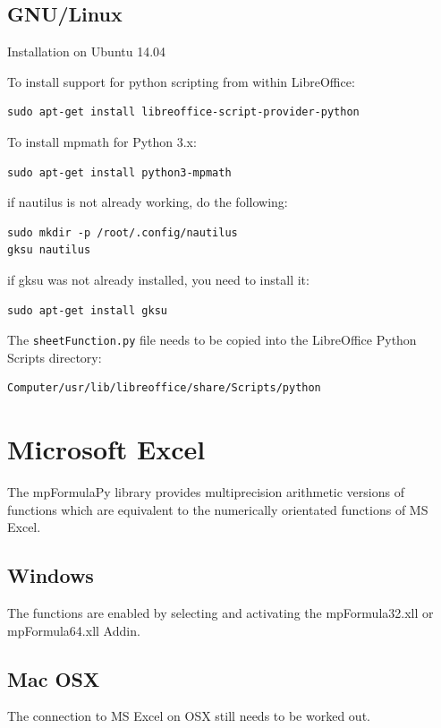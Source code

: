 \subsection{GNU/Linux}
Installation on Ubuntu 14.04

To install support for python scripting from within LibreOffice:
\begin{verbatim}
sudo apt-get install libreoffice-script-provider-python
\end{verbatim}

To install mpmath for Python 3.x:
\begin{verbatim}
sudo apt-get install python3-mpmath
\end{verbatim}

if nautilus is not already working, do the following:
\begin{verbatim}
sudo mkdir -p /root/.config/nautilus
gksu nautilus
\end{verbatim}

if gksu was not already installed, you need to install it:
\begin{verbatim}
sudo apt-get install gksu
\end{verbatim}

The \verb|sheetFunction.py| file needs to be copied into the LibreOffice Python Scripts directory:
\begin{verbatim}
Computer/usr/lib/libreoffice/share/Scripts/python
\end{verbatim}



\newpage
\section{Microsoft Excel}
The mpFormulaPy library provides multiprecision arithmetic versions of  functions which are equivalent to the numerically orientated functions of MS Excel.


\subsection{Windows}
The functions are enabled by selecting and activating the mpFormula32.xll or mpFormula64.xll Addin.


\subsection{Mac OSX}
The connection to MS Excel on OSX still needs to be worked out.




